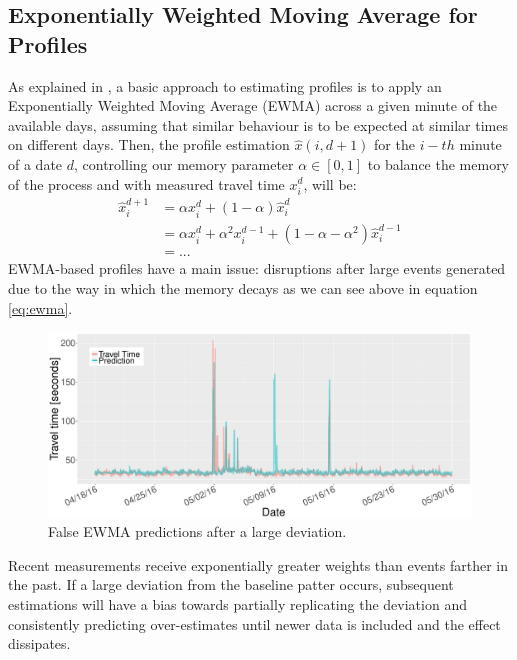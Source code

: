 \documentclass[a4paper, 10pt, conference]{ieeeconf}      %
\begin{document}
\subsection{Exponentially Weighted Moving Average for Profiles} \label{ewma}
As explained in \cite{ttprofiles}, a basic approach to estimating profiles is to apply an Exponentially Weighted Moving Average (EWMA) across a given minute of the available days, assuming that similar behaviour is to be expected at similar times on different days. 
Then, the profile estimation $\hat{x}(i,d+1)$ for the $i-th$ minute of a date $d$, controlling our memory parameter $\alpha \in [0,1]$ to balance the memory of the process and with measured travel time $x_i^d$, will be:
\begin{equation}
\begin{aligned}
\hat{x}^{d+1}_i \!&= \alpha  x^{d}_{i} + (1-\alpha)\hat{x}^{d}_{i} \\ 
&= \alpha  x^{d}_{i} + \alpha^2  x^{d-1}_{i} + (1-\alpha - \alpha^2) \hat{x}^{d-1}_{i}\\ 
&= ...
\end{aligned}
\label{eq:ewma}
\end{equation}
EWMA-based profiles have a main issue: disruptions after large events generated due to the way in which the memory decays as we can see above in equation \ref{eq:ewma}.
\begin{figure}[htbp]
	\centerline{\includegraphics[width=\linewidth]{./images/EWMA.pdf}}
	\caption{False EWMA predictions after a large deviation.}
	\label{fig:EWMA}
\end{figure}
Recent measurements receive exponentially greater weights than events farther in the past. 
If a large deviation from the baseline patter occurs, subsequent estimations will have a bias towards partially replicating the deviation and consistently predicting over-estimates until newer data is included and the effect dissipates.
\end{document}
